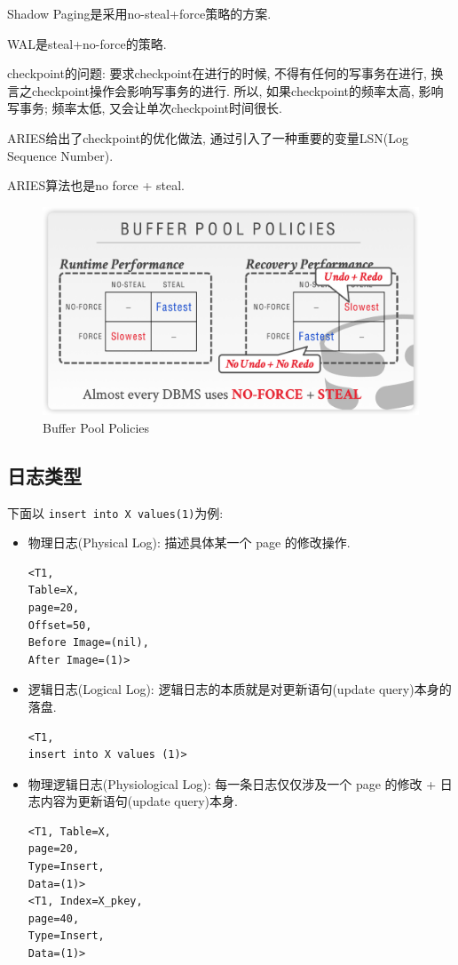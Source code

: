 Shadow Paging是采用no-steal+force策略的方案.

WAL是steal+no-force的策略.

checkpoint的问题: 要求checkpoint在进行的时候, 不得有任何的写事务在进行, 换言之checkpoint操作会影响写事务的进行. 所以, 如果checkpoint的频率太高, 影响写事务; 频率太低, 又会让单次checkpoint时间很长.

ARIES给出了checkpoint的优化做法, 通过引入了一种重要的变量LSN(Log Sequence Number).

ARIES算法也是no force + steal.

\begin{figure}[H]
    \centering
    \includegraphics[width=.7\textwidth]{figure/policies.png}
    \caption{Buffer Pool Policies}
\end{figure}

\subsection{日志类型}

下面以 \verb|insert into X values(1)|为例:
\begin{itemize}
    \item 物理日志(Physical Log): 描述具体某一个 page 的修改操作.
\begin{lstlisting}
<T1,
Table=X,
page=20,
Offset=50,
Before Image=(nil),
After Image=(1)>
\end{lstlisting}
    \item 逻辑日志(Logical Log): 逻辑日志的本质就是对更新语句(update query)本身的落盘.
\begin{lstlisting}
<T1, 
insert into X values (1)>
\end{lstlisting}
    \item 物理逻辑日志(Physiological Log): 每一条日志仅仅涉及一个 page 的修改 + 日志内容为更新语句(update query)本身.
\begin{lstlisting}
<T1, Table=X,
page=20,
Type=Insert,
Data=(1)>
<T1, Index=X_pkey,
page=40,
Type=Insert,
Data=(1)>
\end{lstlisting}
\end{itemize}

